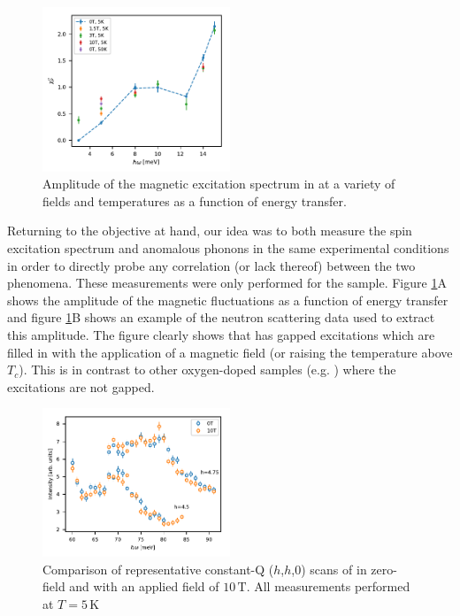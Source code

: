 \begin{figure}[]
    \centering
    \includegraphics[width=0.5\textwidth]{fig/anomaly/chi.pdf}
    \caption{Amplitude of the magnetic excitation spectrum in \LSCOOsix{} at a variety of fields and temperatures as a function of energy transfer.}
    \label{fig:lscoo_chi}
\end{figure}

Returning to the objective at hand, our idea was to both measure the spin excitation spectrum and anomalous phonons in the same experimental conditions in order to directly probe any correlation (or lack thereof) between the two phenomena. These measurements were only performed for the \LSCOOsix{} sample. Figure \ref{fig:lscoo_chi}A shows the amplitude of the magnetic fluctuations as a function of energy transfer and figure \ref{fig:lscoo_chi}B shows an example of the neutron scattering data used to extract this amplitude. The figure clearly shows that \LSCOOsix{} has gapped excitations which are filled in with the application of a magnetic field (or raising the temperature above $T_c$). This is in contrast to other oxygen-doped samples (e.g. \LCOO{} \cite{Jacobsen2018}) where the excitations are not gapped.

\begin{figure}
    \centering
    \includegraphics[width=0.5\textwidth]{fig/anomaly/fig4.pdf}
    \caption{Comparison of representative constant-Q ($h$,$h$,0) scans of \LSCOOsix{} in zero-field and with an applied field of $10\,\text{T}$. All measurements performed at $T=5\,\text{K}$}
    \label{fig:in8_lscoo_field}
\end{figure}

